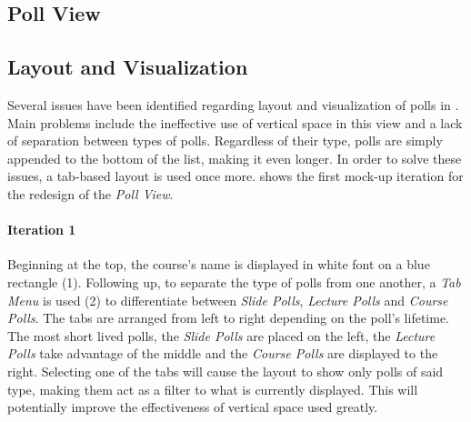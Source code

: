 \subsection{Poll View}

\subsection{Layout and Visualization}
Several issues have been identified regarding layout and visualization of polls in . Main problems include the ineffective use of vertical space in this view and a lack of separation between types of polls. Regardless of their type, polls are simply appended to the bottom of the list, making it even longer.
In order to solve these issues, a tab-based layout is used once more. 
  shows the first mock-up iteration for the redesign of the \emph{Poll View}.
\paragraph{Iteration 1}
Beginning at the top, the course's name is displayed in white font on a blue rectangle (1). Following up, to separate the type of polls from one another, a \emph{Tab Menu} is used (2) to differentiate between \emph{Slide Polls}, \emph{Lecture Polls} and \emph{Course Polls}. The tabs are arranged from left to right depending on the poll's lifetime. The most short lived polls, the \emph{Slide Polls} are placed on the left, the \emph{Lecture Polls} take advantage of the middle and the \emph{Course Polls} are displayed to the right. Selecting one of the tabs will cause the layout to show only polls of said type, making them act as a filter to what is currently displayed. This will potentially improve the effectiveness of vertical space used greatly. 

